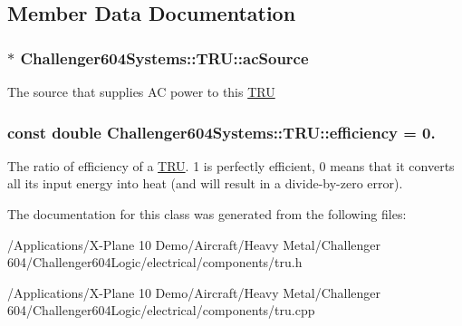 \subsection{Member Data Documentation}
\hypertarget{class_challenger604_systems_1_1_t_r_u_a501cfc80d8c3cecc892787eca2f0d221}{
\subsubsection[{ac\-Source}]{$\ast$ Challenger604\-Systems\-::\-T\-R\-U\-::ac\-Source\hspace{0.3cm}{\ttfamily [protected]}}}\label{class_challenger604_systems_1_1_t_r_u_a501cfc80d8c3cecc892787eca2f0d221}
The source that supplies A\-C power to this \hyperlink{class_challenger604_systems_1_1_t_r_u}{T\-R\-U} \hypertarget{class_challenger604_systems_1_1_t_r_u_a1fe9c57208efea35e91dce1cc2342375}{
\subsubsection[{efficiency}]{\setlength{\rightskip}{0pt plus 5cm}const double Challenger604\-Systems\-::\-T\-R\-U\-::efficiency = 0.\hspace{0.3cm}{\ttfamily [static]}}}\label{class_challenger604_systems_1_1_t_r_u_a1fe9c57208efea35e91dce1cc2342375}
The ratio of efficiency of a \hyperlink{class_challenger604_systems_1_1_t_r_u}{T\-R\-U}. 1 is perfectly efficient, 0 means that it converts all its input energy into heat (and will result in a divide-\/by-\/zero error). 

The documentation for this class was generated from the following files\-:\begin{DoxyCompactItemize}
\item 
/\-Applications/\-X-\/\-Plane 10 Demo/\-Aircraft/\-Heavy Metal/\-Challenger 604/\-Challenger604\-Logic/electrical/components/tru.\-h\item 
/\-Applications/\-X-\/\-Plane 10 Demo/\-Aircraft/\-Heavy Metal/\-Challenger 604/\-Challenger604\-Logic/electrical/components/tru.\-cpp\end{DoxyCompactItemize}
